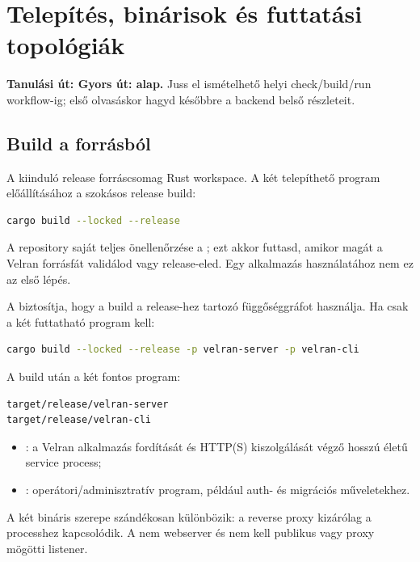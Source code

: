 \chapter{Telepítés, binárisok és futtatási topológiák}\label{ch:telepites}

\noindent\textbf{Tanulási út: Gyors út: alap.} Juss el ismételhető helyi check/build/run workflow-ig; első olvasáskor hagyd későbbre a backend belső részleteit.\par\medskip

\section{Build a forrásból}

A kiinduló release forráscsomag Rust workspace. A két telepíthető program előállításához a szokásos release build:

\begin{lstlisting}[language=bash]
cargo build --locked --release
\end{lstlisting}

A repository saját teljes önellenőrzése a ; ezt akkor futtasd, amikor magát a Velran forrásfát validálod vagy release-eled. Egy alkalmazás használatához nem ez az első lépés.

A  biztosítja, hogy a build a release-hez tartozó  függőséggráfot használja. Ha csak a két futtatható program kell:

\begin{lstlisting}[language=bash]
cargo build --locked --release -p velran-server -p velran-cli
\end{lstlisting}

A build után a két fontos program:

\begin{lstlisting}
target/release/velran-server
target/release/velran-cli
\end{lstlisting}

\begin{itemize}
  \item {}: a Velran alkalmazás fordítását és HTTP(S) kiszolgálását végző hosszú életű service process;
  \item {}: operátori/adminisztratív program, például auth- és migrációs műveletekhez.
\end{itemize}

A két bináris szerepe szándékosan különbözik: a reverse proxy kizárólag a  processhez kapcsolódik. A  nem webserver és nem kell publikus vagy proxy mögötti listener.

